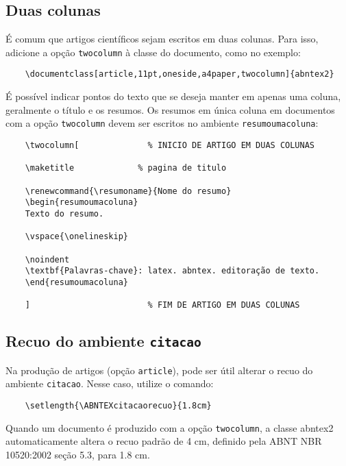 \documentclass[
article,			%
11pt,				%
oneside,			%
a4paper,			%
english,			%
brazil,				%
sumario=tradicional
]{/usr/local/share/texmf/tex/latex/abntex2/abntex2}
\begin{document}
	\subsection{Duas colunas}
	
	É comum que artigos científicos sejam escritos em duas colunas. Para isso,
	adicione a opção \texttt{twocolumn} à classe do documento, como no exemplo:
	
	\begin{verbatim}
	\documentclass[article,11pt,oneside,a4paper,twocolumn]{abntex2}
	\end{verbatim}
	
	É possível indicar pontos do texto que se deseja manter em apenas uma coluna,
	geralmente o título e os resumos. Os resumos em única coluna em documentos com
	a opção \texttt{twocolumn} devem ser escritos no ambiente
	\texttt{resumoumacoluna}:
	
	\begin{verbatim}
	\twocolumn[              % INICIO DE ARTIGO EM DUAS COLUNAS
	
	\maketitle             % pagina de titulo
	
	\renewcommand{\resumoname}{Nome do resumo}
	\begin{resumoumacoluna}
	Texto do resumo.
	
	\vspace{\onelineskip}
	
	\noindent
	\textbf{Palavras-chave}: latex. abntex. editoração de texto.
	\end{resumoumacoluna}
	
	]                        % FIM DE ARTIGO EM DUAS COLUNAS
	\end{verbatim}
	
	\subsection{Recuo do ambiente \texttt{citacao}}
	
	Na produção de artigos (opção \texttt{article}), pode ser útil alterar o recuo
	do ambiente \texttt{citacao}. Nesse caso, utilize o comando:
	
	\begin{verbatim}
	\setlength{\ABNTEXcitacaorecuo}{1.8cm}
	\end{verbatim}
	
	Quando um documento é produzido com a opção \texttt{twocolumn}, a classe
	\textsf{abntex2} automaticamente altera o recuo padrão de 4 cm, definido pela
	ABNT NBR 10520:2002 seção 5.3, para 1.8 cm.
	
\end{document}
